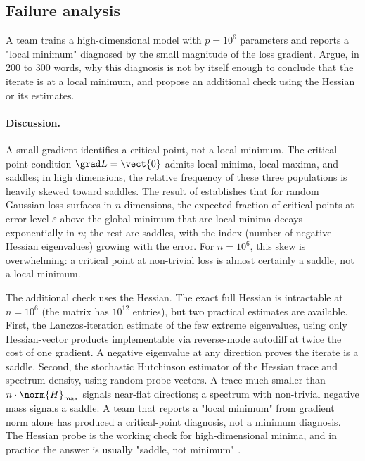 \subsection*{Failure analysis}

\begin{exercise}
A team trains a high-dimensional model with $p = 10^{6}$ parameters
and reports a "local minimum" diagnosed by the small magnitude of
the loss gradient. Argue, in 200 to 300 words, why this diagnosis
is not by itself enough to conclude that the iterate is at a local
minimum, and propose an additional check using the Hessian or its
estimates.

\paragraph{Discussion.} A small gradient identifies a critical
point, not a local minimum. The critical-point condition $\grad L =
\vect{0}$ admits local minima, local maxima, and saddles; in high
dimensions, the relative frequency of these three populations is
heavily skewed toward saddles. The result of
\textcite{paper:v2ch11-dauphin-saddle-2014} establishes that for
random Gaussian loss surfaces in $n$ dimensions, the expected
fraction of critical points at error level $\varepsilon$ above the
global minimum that are local minima decays exponentially in $n$;
the rest are saddles, with the index (number of negative Hessian
eigenvalues) growing with the error. For $n = 10^{6}$, this skew
is overwhelming: a critical point at non-trivial loss is almost
certainly a saddle, not a local minimum.

The additional check uses the Hessian. The exact full Hessian is
intractable at $n = 10^{6}$ (the matrix has $10^{12}$ entries), but
two practical estimates are available. First, the
Lanczos-iteration estimate of the few extreme eigenvalues, using
only Hessian-vector products implementable via reverse-mode
autodiff at twice the cost of one gradient. A negative
eigenvalue at any direction proves the iterate is a saddle. Second,
the stochastic Hutchinson estimator of the Hessian trace and
spectrum-density, using random probe vectors. A trace much smaller
than $n \cdot \norm{H}_{\max}$ signals near-flat directions; a
spectrum with non-trivial negative mass signals a saddle. A team
that reports a "local minimum" from gradient norm alone has
produced a critical-point diagnosis, not a minimum diagnosis. The
Hessian probe is the working check for high-dimensional minima, and
in practice the answer is usually "saddle, not minimum"
\cite{paper:v2c11-yao-hessian-2020}.
\end{exercise}

